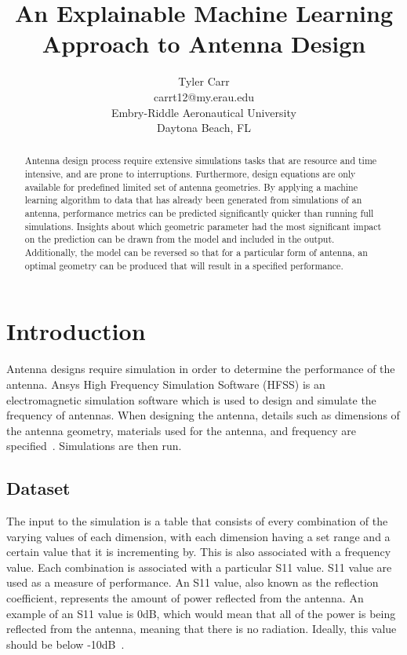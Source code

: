 \documentclass[lettersize,journal]{IEEEtran}
\begin{document}
\title{An Explainable Machine Learning Approach to Antenna Design}

\author{Tyler Carr \\ carrt12@my.erau.edu \\ Embry-Riddle Aeronautical University \\ Daytona Beach, FL}

\maketitle

\begin{abstract}
Antenna design process require extensive simulations tasks that are resource and time intensive, and are prone to interruptions. Furthermore, design equations are only available for predefined limited set of antenna geometries. By applying a machine learning algorithm to data that has already been generated from simulations of an antenna, performance metrics can be predicted significantly quicker than running full simulations. Insights about which geometric parameter had the most significant impact on the prediction can be drawn from the model and included in the output. Additionally, the model can be reversed so that for a particular form of antenna, an optimal geometry can be produced that will result in a specified performance. 
\end{abstract}

\section{Introduction}
Antenna designs require simulation in order to determine the performance of the antenna. Ansys High Frequency Simulation Software (HFSS) is an electromagnetic simulation software which is used to design and simulate the frequency of antennas. When designing the antenna, details such as dimensions of the antenna geometry, materials used for the antenna, and frequency are specified~\cite{Maxworth_2022}. Simulations are then run.


\subsection{Dataset}
The input to the simulation is a table that consists of every combination of the varying values of each dimension, with each dimension having a set range and a certain value that it is incrementing by. This is also associated with a frequency value. Each combination is associated with a particular S11 value. S11 value are used as a measure of performance. An S11 value, also known as the reflection coefficient, represents the amount of power reflected from the antenna. An example of an S11 value is 0dB, which would mean that all of the power is being reflected from the antenna, meaning that there is no radiation. Ideally, this value should be below -10dB~\cite{Bevelacqua_2015}.
\end{document}
